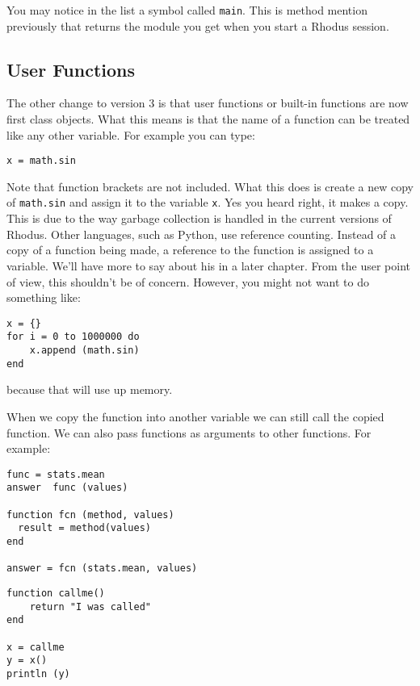 You may notice in the list a symbol called {\tt main}. This is method mention previously that returns the module you get when you start a Rhodus session.


\subsection{User Functions}

The other change to version 3 is that user functions or built-in functions are now first class objects. What this means is that the name of a function can be treated like any other variable. For example you can type:


\begin{lstlisting}
x = math.sin
\end{lstlisting}

Note that function brackets are not included. What this does is create a new copy of {\tt math.sin} and assign it to the variable {\tt x}. Yes you heard right, it makes a copy. This is due to the way garbage collection is handled in the current versions of Rhodus. Other languages, such as Python, use reference counting. Instead of a copy of a function being made, a reference to the function is assigned to a variable. We'll have more to say about his in a later chapter. From the user point of view, this shouldn't be of concern. However, you might not want to do something like:

\begin{lstlisting}
x = {}
for i = 0 to 1000000 do
    x.append (math.sin)
end
\end{lstlisting}

because that will use up memory.

When we copy the function into another variable we can still call the copied function. We can also pass functions as arguments to other functions. For example:

\begin{lstlisting}
func = stats.mean
answer  func (values)

function fcn (method, values)
  result = method(values)
end

answer = fcn (stats.mean, values)
\end{lstlisting}

\begin{lstlisting}
function callme()
    return "I was called"
end

x = callme
y = x()
println (y)
\end{lstlisting}

